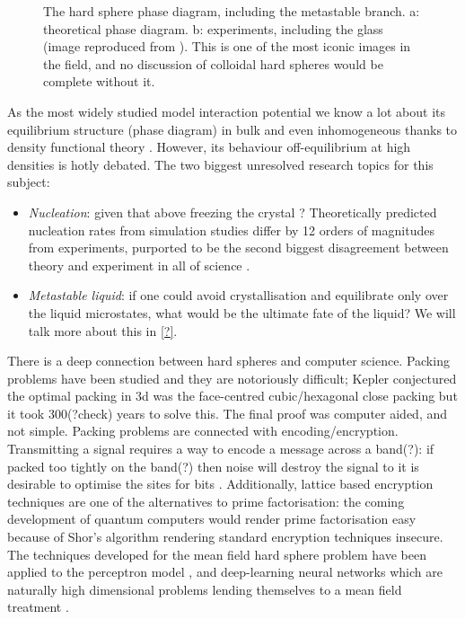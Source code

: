 \documentclass[11pt,twoside]{report}
\begin{document}
\begin{figure}
  \missingfigure[figwidth=\linewidth]{}%
  \caption{The hard sphere phase diagram, including the metastable branch.
    a: theoretical phase diagram.
    b: experiments, including the glass (image reproduced from \cite{?}).
    This is one of the most iconic images in the field, and no discussion of colloidal hard spheres would be complete without it.}
\end{figure}

As the most widely studied model interaction potential we know a lot about its equilibrium structure (phase diagram) in bulk and even inhomogeneous thanks to density functional theory \cite{?,?,?}.
However, its behaviour off-equilibrium at high densities is hotly debated.
The two biggest unresolved research topics for this subject:
\begin{itemize}
\item \emph{Nucleation}: given that above freezing the crystal ? Theoretically predicted nucleation rates from simulation studies differ by 12 orders of magnitudes from experiments, purported to be the second biggest disagreement between theory and experiment in all of science \cite{?}.
\item \emph{Metastable liquid}: if one could avoid crystallisation and equilibrate only over the liquid microstates, what would be the ultimate fate of the liquid?
  We will talk more about this in \ref{?}.
\end{itemize}

There is a deep connection between hard spheres and computer science.
Packing problems have been studied \cite{Cohn,Conway,Sloane} and they are notoriously difficult; Kepler conjectured the optimal packing in 3d was the face-centred cubic/hexagonal close packing but it took 300(?check) years to solve this.
The final proof was computer aided, and not simple.
Packing problems are connected with encoding/encryption.
Transmitting a signal requires a way to encode a message across a band(?): if packed too tightly on the band(?) then noise will destroy the signal to it is desirable to optimise the sites for bits \cite{Cohn,?,?}.
Additionally, lattice based encryption techniques are one of the alternatives to prime factorisation: the coming development of quantum computers \cite{?,?} would render prime factorisation easy because of Shor's algorithm \cite{Shor?} rendering standard encryption techniques insecure.
The techniques developed for the mean field hard sphere problem have been applied to the perceptron model \cite{?}, and deep-learning neural networks which are naturally high dimensional problems lending themselves to a mean field treatment \cite{?}.
\end{document}
